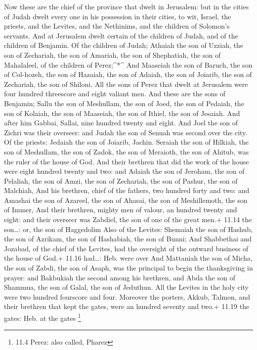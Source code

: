  Now these are the chief of the province that dwelt in
Jerusalem: but in the cities of Judah dwelt every one in his possession
in their cities, to wit, Israel, the priests, and the Levites, and the
Nethinims, and the children of Solomon's servants.  And at
Jerusalem dwelt certain of the children of Judah, and of the children of
Benjamin. Of the children of Judah; Athaiah the son of Uzziah, the son
of Zechariah, the son of Amariah, the son of Shephatiah, the son of
Mahalaleel, of the children of Perez;\^{}*\^{}  And Maaseiah
the son of Baruch, the son of Col-hozeh, the son of Hazaiah, the son of
Adaiah, the son of Joiarib, the son of Zechariah, the son of Shiloni.
 All the sons of Perez that dwelt at Jerusalem were four
hundred threescore and eight valiant men.  And these are the
sons of Benjamin; Sallu the son of Meshullam, the son of Joed, the son
of Pedaiah, the son of Kolaiah, the son of Maaseiah, the son of Ithiel,
the son of Jesaiah.  And after him Gabbai, Sallai, nine
hundred twenty and eight.  And Joel the son of Zichri was
their overseer: and Judah the son of Senuah was second over the city.
 Of the priests: Jedaiah the son of Joiarib, Jachin.
 Seraiah the son of Hilkiah, the son of Meshullam, the son
of Zadok, the son of Meraioth, the son of Ahitub, was the ruler of the
house of God.  And their brethren that did the work of the
house were eight hundred twenty and two: and Adaiah the son of Jeroham,
the son of Pelaliah, the son of Amzi, the son of Zechariah, the son of
Pashur, the son of Malchiah,  And his brethren, chief of
the fathers, two hundred forty and two: and Amashai the son of Azareel,
the son of Ahasai, the son of Meshillemoth, the son of Immer,
 And their brethren, mighty men of valour, an hundred
twenty and eight: and their overseer was Zabdiel, the son of one of the
great men.+ 11.14 the son\ldots: or, the son of Haggedolim 
Also of the Levites: Shemaiah the son of Hashub, the son of Azrikam, the
son of Hashabiah, the son of Bunni;  And Shabbethai and
Jozabad, of the chief of the Levites, had the oversight of the outward
business of the house of God.+ 11.16 had\ldots: Heb. were over
 And Mattaniah the son of Micha, the son of Zabdi, the son
of Asaph, was the principal to begin the thanksgiving in prayer: and
Bakbukiah the second among his brethren, and Abda the son of Shammua,
the son of Galal, the son of Jeduthun.  All the Levites in
the holy city were two hundred fourscore and four. 
Moreover the porters, Akkub, Talmon, and their brethren that kept the
gates, were an hundred seventy and two.+ 11.19 the gates: Heb. at the
gates \footnote{11.4 Perez: also called, Pharez}

